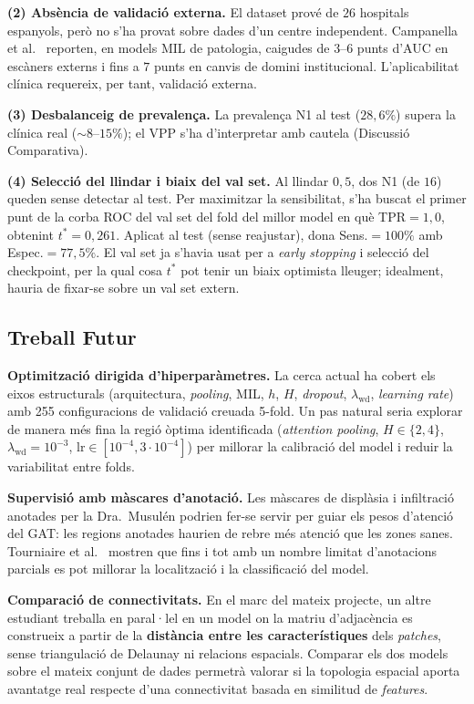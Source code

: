 \documentclass[10pt,a4paper,twocolumn,twoside]{article}
\begin{document}
\textbf{(2) Absència de validació externa.}
El dataset prové de $26$ hospitals espanyols, però no s'ha provat sobre dades d'un centre
independent. Campanella et al.~\cite{campanella2019} reporten, en models MIL de patologia,
caigudes de $3$–$6$ punts d'AUC en escàners externs i fins a $7$ punts en canvis de
domini institucional. L'aplicabilitat clínica requereix, per tant, validació externa.

\textbf{(3) Desbalanceig de prevalença.}
La prevalença N1 al test ($28{,}6\%$) supera la clínica real ($\sim\!8$–$15\%$); el VPP
s'ha d'interpretar amb cautela (Discussió Comparativa).

\textbf{(4) Selecció del llindar i biaix del val set.}
Al llindar $0{,}5$, dos N1 (de $16$) queden sense detectar al test. Per maximitzar la
sensibilitat, s'ha buscat el primer punt de la corba ROC del val set del fold del millor
model en què TPR$=\!1{,}0$, obtenint $t^*\!=\!0{,}261$. Aplicat al test (sense reajustar),
dona Sens.$=\!100\%$ amb Espec.$=\!77{,}5\%$. El val set ja s'havia usat per a \textit{early
stopping} i selecció del checkpoint, per la qual cosa $t^*$ pot tenir un biaix optimista
lleuger; idealment, hauria de fixar-se sobre un val set extern.

\subsection{Treball Futur}

\textbf{Optimització dirigida d'hiperparàmetres.} La cerca actual ha cobert els eixos
estructurals (arquitectura, \textit{pooling}, MIL, $h$, $H$, \textit{dropout},
$\lambda_{\text{wd}}$, \textit{learning rate}) amb 255 configuracions de validació creuada
5-fold. Un pas natural seria explorar de manera més fina la regió òptima identificada
(\textit{attention pooling}, $H \in \{2, 4\}$, $\lambda_{\text{wd}} = 10^{-3}$,
$\text{lr} \in [10^{-4}, 3 \!\cdot\! 10^{-4}]$) per millorar la calibració del model
i reduir la variabilitat entre folds.

\textbf{Supervisió amb màscares d'anotació.} Les màscares de displàsia i infiltració
anotades per la Dra.\ Musulén podrien fer-se servir per guiar els pesos d'atenció del
GAT: les regions anotades haurien de rebre més atenció que les zones sanes. Tourniaire et
al.~\cite{TOURNIAIRE2023102763} mostren que fins i tot amb un nombre limitat d'anotacions
parcials es pot millorar la localització i la classificació del model.

\textbf{Comparació de connectivitats.} En el marc del mateix projecte, un altre estudiant
treballa en paral·lel en un model on la matriu d'adjacència es construeix a partir de la
\textbf{distància entre les característiques} dels \textit{patches}, sense triangulació de
Delaunay ni relacions espacials. Comparar els dos models sobre el mateix conjunt de dades
permetrà valorar si la topologia espacial aporta avantatge real respecte d'una
connectivitat basada en similitud de \textit{features}.
\end{document}
